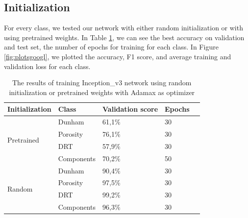 \subsection{Initialization}
For every class, we tested our network with either random initialization or with using pretrained weights. In Table \ref{tab:googinit}, we can see the best accuracy on validation and test set, the number of epochs for training for each class.  
In Figure \ref{fig:plotsgoogl}, we plotted the accuracy, F1 score, and average training and validation loss for each class. 

\begin{table}
\caption{\label{tab:googinit} The results of training Inception\_v3 network using random initialization or pretrained weights with Adamax as optimizer}
\centering
\begin{tabular}[b]{| l | l | l | l | l |}
\hline
    Initialization & Class & Validation score  & Epochs\\ \hline
    \multirow{4}{*}{Pretrained} & Dunham &  61,1\%  & 30 \\ %
    & Porosity & 76,1\% &  30 \\
    &DRT & 57,9\% &  30 \\
    &Components & 70,2\% &  50 \\ \hline
     \multirow{4}{*}{Random} & Dunham &  90,4\% & 30 \\
    & Porosity & 97,5\% &  30 \\
    &DRT & 99,2\% &  30 \\
    &Components & 96,3\% & 30 \\ \hline
\end{tabular} 
\end{table}

